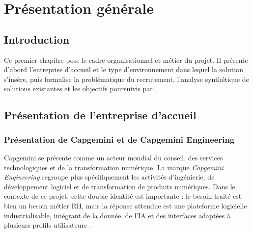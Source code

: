 \chapter{Présentation générale}

\section*{Introduction}
Ce premier chapitre pose le cadre organisationnel et métier du projet. Il présente d'abord l'entreprise d'accueil et le type d'environnement dans lequel la solution s'insère, puis formalise la problématique du recrutement, l'analyse synthétique de solutions existantes et les objectifs poursuivis par \projectname{}.

\section{Présentation de l'entreprise d'accueil}

\subsection{Présentation de Capgemini et de Capgemini Engineering}
Capgemini se présente comme un acteur mondial du conseil, des services technologiques et de la transformation numérique. La marque \textit{Capgemini Engineering} regroupe plus spécifiquement les activités d'ingénierie, de développement logiciel et de transformation de produits numériques. Dans le contexte de ce projet, cette double identité est importante : le besoin traité est bien un besoin métier RH, mais la réponse attendue est une plateforme logicielle industrialisable, intégrant de la donnée, de l'IA et des interfaces adaptées à plusieurs profils utilisateurs .


